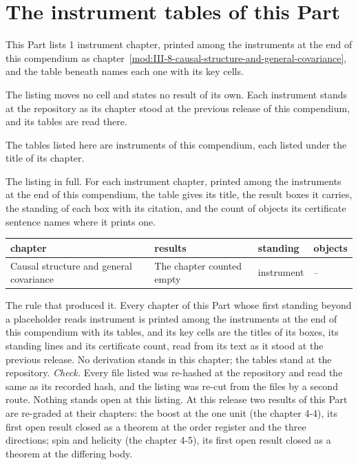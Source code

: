 \section{The instrument tables of this Part}\label{mod:IV-L-the-instrument-tables-at-the-repository}
\begin{chtable}\label{box:IV-L-the-instrument-tables-at-the-repository:1}
This Part lists 1 instrument chapter, printed among the instruments at the end of this compendium as chapter~\ref{mod:III-8-causal-structure-and-general-covariance}, and the table beneath names each one with its key cells.
\end{chtable}
The listing moves no cell and states no result of its own. Each instrument stands at the repository as its chapter stood at the previous release of this compendium, and its tables are read there.
\begin{chbridge}
The tables listed here are instruments of this compendium, each listed under the title of its chapter.
\end{chbridge}
\begin{chproof}[instrument]
The listing in full. For each instrument chapter, printed among the instruments at the end of this compendium, the table gives its title, the result boxes it carries, the standing of each box with its citation, and the count of objects its certificate sentence names where it prints one.
{\small
\begin{longtable}{p{38mm}p{63mm}p{30mm}p{14mm}}
\hline
chapter & results & standing & objects \\
\hline
\endhead
Causal structure and general covariance & The chapter counted empty & instrument & -- \\
\hline
\end{longtable}
}
The rule that produced it. Every chapter of this Part whose first standing beyond a placeholder reads instrument is printed among the instruments at the end of this compendium with its tables, and its key cells are the titles of its boxes, its standing lines and its certificate count, read from its text as it stood at the previous release.
No derivation stands in this chapter; the tables stand at the repository.
\emph{Check.} Every file listed was re-hashed at the repository and read the same as its recorded hash, and the listing was re-cut from the files by a second route.
Nothing stands open at this listing. At this release two results of this Part are re-graded at their chapters: the boost at the one unit (the chapter 4-4), its first open result closed as a theorem at the order register and the three directions; spin and helicity (the chapter 4-5), its first open result closed as a theorem at the differing body.
\end{chproof}
\label{chend:IV-L-the-instrument-tables-at-the-repository}
